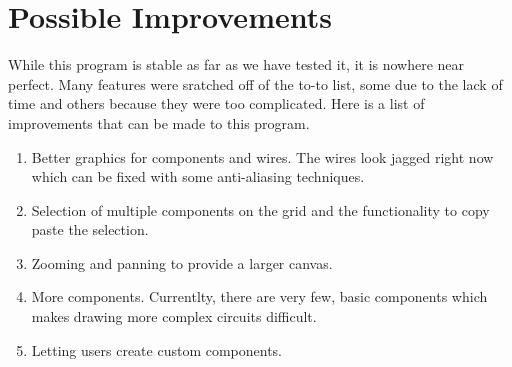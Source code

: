 \documentclass[report]{subfiles}
\begin{document}
	\section{Possible Improvements}
	While this program is stable as far as we have tested it, it is nowhere near perfect. Many features were sratched off of the to-to list, some due to the lack of time and others because they were too complicated. Here is a list of improvements that can be made to this program.
    \begin{enumerate}
    	\item{Better graphics for components and wires. The wires look jagged right now which can be fixed with some anti-aliasing techniques.}
	\item{Selection of multiple components on the grid and the functionality to copy paste the selection.}
	\item{Zooming and panning to provide a larger canvas.}
	\item{More components. Currentlty, there are very few, basic components which makes drawing more complex circuits difficult.}
	\item{Letting users create custom components.}
    \end{enumerate}
\end{document}
